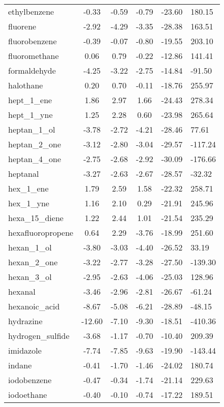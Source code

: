 \documentclass{amsart}
\begin{document}
\begin{longtable}{L|C|C|C|X|X}
ethylbenzene & -0.33 & -0.59 & -0.79 & -23.60 & 180.15 \\ 
fluorene & -2.92 & -4.29 & -3.35 & -28.38 & 163.51 \\ 
fluorobenzene & -0.39 & -0.07 & -0.80 & -19.55 & 203.10 \\ 
fluoromethane & 0.06 & 0.79 & -0.22 & -12.86 & 141.41 \\ 
formaldehyde & -4.25 & -3.22 & -2.75 & -14.84 & -91.50 \\ 
halothane & 0.20 & 0.70 & -0.11 & -18.76 & 255.97 \\ 
hept\_1\_ene & 1.86 & 2.97 & 1.66 & -24.43 & 278.34 \\ 
hept\_1\_yne & 1.25 & 2.28 & 0.60 & -23.98 & 265.64 \\ 
heptan\_1\_ol & -3.78 & -2.72 & -4.21 & -28.46 & 77.61 \\ 
heptan\_2\_one & -3.12 & -2.80 & -3.04 & -29.57 & -117.24 \\ 
heptan\_4\_one & -2.75 & -2.68 & -2.92 & -30.09 & -176.66 \\ 
heptanal & -3.27 & -2.63 & -2.67 & -28.57 & -32.32 \\ 
hex\_1\_ene & 1.79 & 2.59 & 1.58 & -22.32 & 258.71 \\ 
hex\_1\_yne & 1.16 & 2.10 & 0.29 & -21.91 & 245.96 \\ 
hexa\_15\_diene & 1.22 & 2.44 & 1.01 & -21.54 & 235.29 \\ 
hexafluoropropene & 0.64 & 2.29 & -3.76 & -18.99 & 251.60 \\ 
hexan\_1\_ol & -3.80 & -3.03 & -4.40 & -26.52 & 33.19 \\ 
hexan\_2\_one & -3.22 & -2.77 & -3.28 & -27.50 & -139.30 \\ 
hexan\_3\_ol & -2.95 & -2.63 & -4.06 & -25.03 & 128.96 \\ 
hexanal & -3.46 & -2.96 & -2.81 & -26.67 & -61.24 \\ 
hexanoic\_acid & -8.67 & -5.08 & -6.21 & -28.89 & -48.15 \\ 
hydrazine & -12.60 & -7.10 & -9.30 & -18.51 & -410.36 \\ 
hydrogen\_sulfide & -3.68 & -1.17 & -0.70 & -10.40 & 209.39 \\ 
imidazole & -7.74 & -7.85 & -9.63 & -19.90 & -143.44 \\ 
indane & -0.41 & -1.70 & -1.46 & -24.02 & 180.74 \\ 
iodobenzene & -0.47 & -0.34 & -1.74 & -21.14 & 229.63 \\ 
iodoethane & -0.40 & -0.10 & -0.74 & -17.22 & 189.51 \\ 

\end{longtable}
\end{document}
